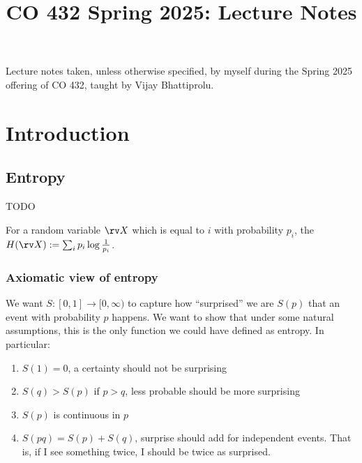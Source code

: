 \documentclass[notes,tikz]{agony}
\title{CO 432 Spring 2025: Lecture Notes}
\begin{document}
\renewcommand{\contentsname}{CO 432 Spring 2025:\\{\huge Lecture Notes}}
\thispagestyle{firstpage}
\tableofcontents

Lecture notes taken, unless otherwise specified,
by myself during the Spring 2025 offering of CO 432,
taught by Vijay Bhattiprolu.

\begin{multicols}{2}
  \listoflecture
\end{multicols}

\chapter{Introduction}

\section{Entropy}
TODO

\begin{defn}[entropy]
  For a random variable $\rv X$ which is equal to $i$ with probability $p_i$,
  the  $H(\rv X) := \sum_i p_i \log \frac{1}{p_i}$.
\end{defn}

\subsection{Axiomatic view of entropy}

We want $S : [0,1] \to [0,\infty)$ to capture how ``surprised''
we are $S(p)$ that an event with probability $p$ happens.
We want to show that under some natural assumptions,
this is the only function we could have defined as entropy.
In particular:

\begin{enumerate}
  \item $S(1) = 0$, a certainty should not be surprising
  \item $S(q) > S(p)$ if $p > q$, less probable should be more surprising
  \item $S(p)$ is continuous in $p$
  \item $S(pq) =  S(p) + S(q)$, surprise should add for independent events.
        That is, if I see something twice, I should be twice as surprised.
\end{enumerate}
\end{document}

